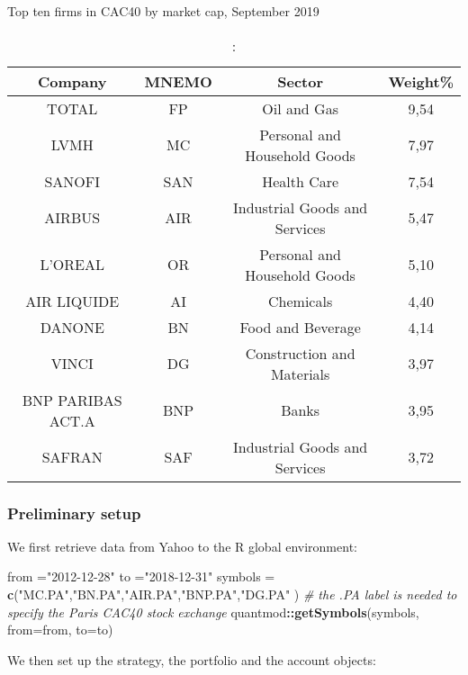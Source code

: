 \documentclass[
  11pt,
]{article}
\newenvironment{Shaded}{\begin{snugshade}}{\end{snugshade}}
\newcommand{\CommentTok}[1]{\textcolor[rgb]{0.56,0.35,0.01}{\textit{#1}}}
\newcommand{\DataTypeTok}[1]{\textcolor[rgb]{0.13,0.29,0.53}{#1}}
\newcommand{\KeywordTok}[1]{\textcolor[rgb]{0.13,0.29,0.53}{\textbf{#1}}}
\newcommand{\NormalTok}[1]{#1}
\newcommand{\OperatorTok}[1]{\textcolor[rgb]{0.81,0.36,0.00}{\textbf{#1}}}
\newcommand{\StringTok}[1]{\textcolor[rgb]{0.31,0.60,0.02}{#1}}
\begin{document}
\begin{table}[ht]
\caption:{Top ten firms in CAC40 by market cap, September 2019}
\centering
\begin{tabular}{|c|c|c|c|}
  \hline
Company & MNEMO  &  Sector  & Weight\% \\
  \hline
  TOTAL &   FP  & Oil and Gas & 9,54 \\
  LVMH &    MC  & Personal and Household Goods & 7,97 \\
  SANOFI & SAN  & Health Care & 7,54 \\
  AIRBUS & AIR  & Industrial Goods and Services &   5,47 \\
  L'OREAL   & OR  & Personal and Household Goods &  5,10 \\
  AIR LIQUIDE & AI  & Chemicals &   4,40 \\
  DANONE &  BN  & Food and Beverage & 4,14 \\
  VINCI &   DG & Construction and Materials & 3,97 \\
  BNP PARIBAS ACT.A &   BNP  & Banks & 3,95 \\
  SAFRAN & SAF  & Industrial Goods and Services & 3,72 \\
   \hline
\end{tabular}
\end{table}

\hypertarget{preliminary-setup}{%
\subsubsection{Preliminary setup}\label{preliminary-setup}}

We first retrieve data from Yahoo to the R global environment:

\begin{Shaded}
\begin{Highlighting}[]
\NormalTok{from =}\StringTok{"2012-12-28"}
\NormalTok{to =}\StringTok{"2018-12-31"}
\NormalTok{symbols =}\StringTok{ }\KeywordTok{c}\NormalTok{(}\StringTok{"MC.PA"}\NormalTok{,}\StringTok{"BN.PA"}\NormalTok{,}\StringTok{"AIR.PA"}\NormalTok{,}\StringTok{"BNP.PA"}\NormalTok{,}\StringTok{"DG.PA"}\NormalTok{ )}
\CommentTok{# the .PA label is needed to specify the Paris CAC40 stock exchange}
\NormalTok{quantmod}\OperatorTok{::}\KeywordTok{getSymbols}\NormalTok{(symbols,}
                     \DataTypeTok{from=}\NormalTok{from, }\DataTypeTok{to=}\NormalTok{to)}
\end{Highlighting}
\end{Shaded}

We then set up the strategy, the portfolio and the account objects:
\end{document}
